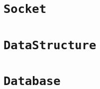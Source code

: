 \documentclass[10pt,twoside]{ctexart}
\begin{document}
\subsection[\tt TCP/IP]{\color{blue}{\tt TCP/IP}}%
\subsubsection[{\tt TCP/IP}协议中的三次握手和四次挥手]{}


\newpage
\section{\tt Socket}
\subsection[{\tt IO}多路复用]{}


\newpage
\section{\tt Data\space Structure}


\newpage
\section{\tt Database}
\end{document}
